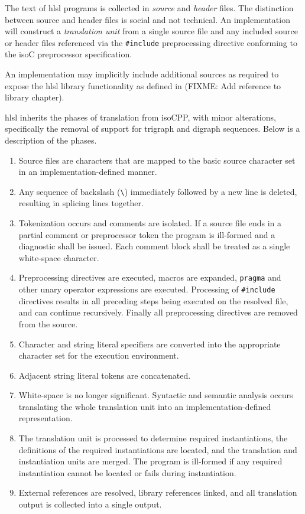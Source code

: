 

\p The text of \acrshort{hlsl} programs is collected in \textit{source} and
\textit{header} files. The distinction between source and header files is social
and not technical. An implementation will construct a \textit{translation unit}
from a single source file and any included source or header files referenced via
the \texttt{\#include} preprocessing directive conforming to the \gls{isoC}
preprocessor specification.

\p An implementation may implicitly include additional sources as required to
expose the \acrshort{hlsl} library functionality as defined in (FIXME: Add
reference to library chapter).


\p \acrshort{hlsl} inherits the phases of translation from \gls{isoCPP}, with
minor alterations, specifically the removal of support for trigraph and digraph
sequences. Below is a description of the phases.

\begin{enumerate}
  \item Source files are characters that are mapped to the basic source
  character set in an implementation-defined manner.
  \item Any sequence of backslash (\texttt{\textbackslash}) immediately followed
  by a new line is deleted, resulting in splicing lines together.
  \item Tokenization occurs and comments are isolated. If a source file ends in
  a partial comment or preprocessor token the program is ill-formed and a
  diagnostic shall be issued. Each comment block shall be treated as a single
  white-space character.
  \item Preprocessing directives are executed, macros are expanded,
  \texttt{pragma} and other unary operator expressions are executed. Processing
  of \texttt{\#include} directives results in all preceding steps being executed
  on the resolved file, and can continue recursively. Finally all preprocessing
  directives are removed from the source.
  \item Character and string literal specifiers are converted into the
  appropriate character set for the execution environment.
  \item Adjacent string literal tokens are concatenated.
  \item White-space is no longer significant. Syntactic and semantic analysis
  occurs translating the whole translation unit into an implementation-defined
  representation.
  \item The translation unit is processed to determine required instantiations,
  the definitions of the required instantiations are located, and the
  translation and instantiation units are merged. The program is ill-formed if
  any required instantiation cannot be located or fails during instantiation.
  \item External references are resolved, library references linked, and all
  translation output is collected into a single output.
\end{enumerate}

